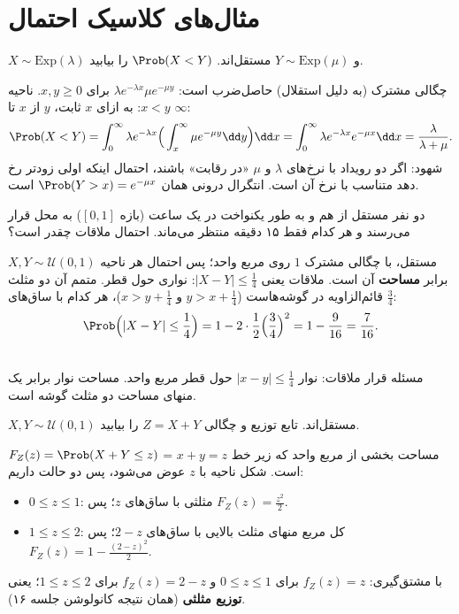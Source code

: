 \section{مثال‌های کلاسیک احتمال}

\begin{example}
$X\sim\mathrm{Exp}(\lambda)$ و $Y\sim\mathrm{Exp}(\mu)$ مستقل‌اند. $\Prob(X<Y)$ را بیابید.
\begin{solution}
چگالی مشترک (به دلیل استقلال) حاصل‌ضرب است: $\lambda e^{-\lambda x}\mu e^{-\mu y}$ برای $x,y\ge0$. ناحیه $x<y$: به ازای $x$ ثابت، $y$ از $x$ تا $\infty$:
\[
\Prob(X<Y)=\int_0^\infty\lambda e^{-\lambda x}\Big(\int_x^\infty\mu e^{-\mu y}\dd y\Big)\dd x=\int_0^\infty\lambda e^{-\lambda x}e^{-\mu x}\dd x=\frac{\lambda}{\lambda+\mu}.
\]
شهود: اگر دو رویداد با نرخ‌های $\lambda$ و $\mu$ «در رقابت» باشند، احتمال اینکه اولی زودتر رخ دهد متناسب با نرخ آن است. انتگرال درونی همان $\Prob(Y>x)=e^{-\mu x}$ است.
\end{solution}
\end{example}

\begin{example}
دو نفر مستقل از هم و به طور یکنواخت در یک ساعت (بازه $[0,1]$) به محل قرار می‌رسند و هر کدام فقط ۱۵ دقیقه منتظر می‌ماند. احتمال ملاقات چقدر است؟
\begin{solution}
$X,Y\sim\mathcal U(0,1)$ مستقل، با چگالی مشترک $1$ روی مربع واحد؛ پس احتمال هر ناحیه برابر \textbf{مساحت} آن است. ملاقات یعنی $|X-Y|\le\frac14$: نواری حول قطر. متمم آن دو مثلث قائم‌الزاویه در گوشه‌هاست ($y>x+\frac14$ و $x>y+\frac14$)، هر کدام با ساق‌های $\frac34$:
\[
\Prob\Big(|X-Y|\le\frac14\Big)=1-2\cdot\frac12\Big(\frac34\Big)^2=1-\frac{9}{16}=\frac{7}{16}.
\]
\end{solution}
\end{example}

\begin{center}
\begin{tikzpicture}
\end{tikzpicture}\\
{\small مسئله قرار ملاقات: نوار $|x-y|\le\frac14$ حول قطر مربع واحد. مساحت نوار برابر یک منهای مساحت دو مثلث گوشه است.}
\end{center}

\begin{example}
$X,Y\sim\mathcal U(0,1)$ مستقل‌اند. تابع توزیع و چگالی $Z=X+Y$ را بیابید.
\begin{solution}
$F_Z(z)=\Prob(X+Y\le z)$ = مساحت بخشی از مربع واحد که زیر خط $x+y=z$ است. شکل ناحیه با $z$ عوض می‌شود، پس دو حالت داریم:
\begin{itemize}
\item $0\le z\le1$: مثلثی با ساق‌های $z$؛ پس $F_Z(z)=\frac{z^2}{2}$.
\item $1\le z\le2$: کل مربع منهای مثلث بالایی با ساق‌های $2-z$؛ پس $F_Z(z)=1-\frac{(2-z)^2}{2}$.
\end{itemize}
با مشتق‌گیری: $f_Z(z)=z$ برای $0\le z\le1$ و $f_Z(z)=2-z$ برای $1\le z\le2$؛ یعنی \textbf{توزیع مثلثی} (همان نتیجه کانولوشن جلسه ۱۶).
\end{solution}
\end{example}

